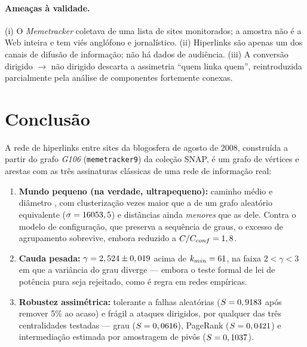 \documentclass[sigconf]{webmedia}
\begin{document}
\paragraph{Ameaças à validade.} (i) O \textit{Memetracker} coletava de uma
lista de sites monitorados; a amostra não é a Web inteira e tem viés
anglófono e jornalístico. (ii) Hiperlinks são apenas um dos canais de
difusão de informação; não há dados de audiência. (iii) A conversão
dirigido $\to$ não dirigido descarta a assimetria ``quem linka quem'',
reintroduzida parcialmente pela análise de componentes fortemente conexas.

\section{Conclusão}

A rede de hiperlinks entre sites da blogosfera de agosto de 2008,
construída a partir do grafo \textit{G106} (\texttt{memetracker9}) da
coleção SNAP, é um grafo de \numVertices{} vértices e \numArestas{} arestas
com as três assinaturas clássicas de uma rede de informação real:

\begin{enumerate}[nosep]
  \item \textbf{Mundo pequeno (na verdade, ultrapequeno):} caminho médio
        \swL{} e diâmetro \diametro{}, com clusterização \swRazaoCer{}
        vezes maior que a de um grafo aleatório equivalente
        ($\sigma = 16053,5{}$) e distâncias ainda \emph{menores} que
        as dele. Contra o modelo de configuração, que preserva a sequência
        de graus, o excesso de agrupamento sobrevive, embora reduzido a
        $C/C_{conf} = 1,8{}$.
  \item \textbf{Cauda pesada:} $\gamma = 2,524 \pm 0,019$ acima
        de $k_{min} = 61{}$, na faixa $2<\gamma<3$ em que a variância
        do grau diverge --- embora o teste formal de lei de potência pura
        seja rejeitado, como é regra em redes empíricas.
  \item \textbf{Robustez assimétrica:} tolerante a falhas aleatórias
        ($S=0,9183{}$ após remover 5\% ao acaso) e frágil a ataques
        dirigidos, por qualquer das três centralidades testadas ---
        grau ($S=0,0616{}$), PageRank ($S=0,0421{}$) e
        intermediação estimada por amostragem de pivôs ($S=0,1037{}$).
\end{enumerate}
\end{document}
